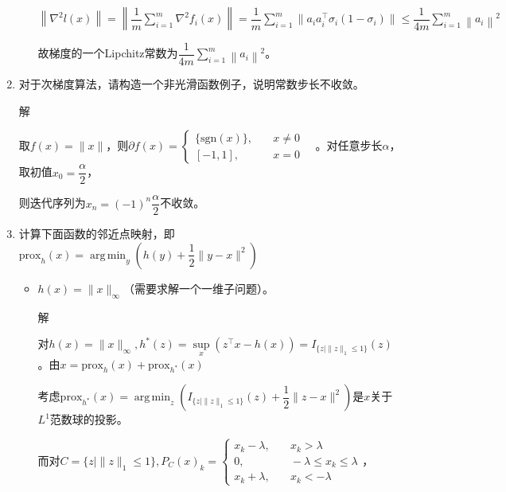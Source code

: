 \documentclass[cn,hazy,cyan,11pt,normal]{elegantnote}
\newcommand*{\prox}{\mathrm{prox}}
\DeclareMathOperator*{\argmin}{arg\,min}
\begin{document}
\begin{enumerate}
\begin{itemize}
                    $\left\|\nabla^2 l(x)\right\|=\left\|\dfrac1m\sum\limits_{i=1}^m \nabla^2 f_i(x)\right\|=\dfrac1m \sum\limits_{i=1}^m \|a_i a_i^{\top}\sigma_i(1-\sigma_i)\|\leq\dfrac1{4m}\sum\limits_{i=1}^m \left\|a_i\right\|^2$

                    故梯度的一个Lipchitz常数为$\dfrac1{4m}\sum\limits_{i=1}^m \left\|a_i\right\|^2$。\vspace{0.5cm}

            \end{itemize}

        \item {\color{c1}对于次梯度算法，请构造一个非光滑函数例子，说明常数步长不收敛。}

            \vspace{0.5cm}\textcolor{c2}解

            取$f(x)=\|x\|$，则$\partial f(x)=\begin{cases}\{\mathrm{sgn}(x)\},\quad&x\neq0 \\ [-1,1] ,\quad&x=0\end{cases} \quad$。对任意步长$\alpha$，取初值$x_0=\dfrac{\alpha}{2}$，

            则迭代序列为$x_n=(-1)^n\dfrac{\alpha}{2}$不收敛。\vspace{0.5cm}

        \item {\color{c1}计算下面函数的邻近点映射，即$\prox_h (x)=\argmin_y\left(h(y)+\dfrac12\|y-x\|^2\right)$}

            \begin{itemize}
                \item {\color{c1} $h(x)=\|x\|_{\infty}$（需要求解一个一维子问题）。}

                    \vspace{0.5cm}\textcolor{c2}解

                    对$h(x)=\|x\|_{\infty},h^*(z)=\sup\limits_x(z^{\top}x-h(x))=I_{\{z\mid\|z\|_1\leq 1\}}(z)$。由$x=\prox_h(x)+\prox_{h^*}(x)$

                    考虑$\prox_{h^*} (x)=\argmin_z\left(I_{\{z\mid\|z\|_1\leq 1\}}(z)+\dfrac12\|z-x\|^2\right)$是$x$关于$L^1$范数球的投影。

                    而对$C=\{z\mid\|z\|_1\leq 1\},P_C(x)_k=\begin{cases}x_k-\lambda,&\quad x_k>\lambda\\0,&\quad -\lambda\leq x_k\leq\lambda\\x_k+\lambda,&\quad x_k<-\lambda\end{cases}$，


\end{itemize}
\end{enumerate}
\end{document}
